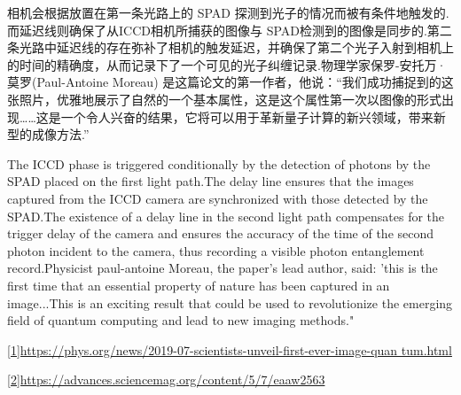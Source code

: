 \begin{multicols}{2}

相机会根据放置在第一条光路上的 SPAD 探测到光子的情况而被有条件地触发的.而延迟线则确保了从ICCD相机所捕获的图像与 SPAD检测到的图像是同步的.第二条光路中延迟线的存在弥补了相机的触发延迟，并确保了第二个光子入射到相机上的时间的精确度，从而记录下了一个可见的光子纠缠记录.物理学家保罗-安托万·莫罗(Paul-Antoine Moreau) 是这篇论文的第一作者，他说：“我们成功捕捉到的这张照片，优雅地展示了自然的一个基本属性，这是这个属性第一次以图像的形式出现……这是一个令人兴奋的结果，它将可以用于革新量子计算的新兴领域，带来新型的成像方法.” 

The ICCD phase is triggered conditionally by the detection of photons by the SPAD placed on the first light path.The delay line ensures that the images captured from the ICCD camera are synchronized with those detected by the SPAD.The existence of a delay line in the second light path compensates for the trigger delay of the camera and ensures the accuracy of the time of the second photon incident to the camera, thus recording a visible photon entanglement record.Physicist paul-antoine Moreau, the paper's lead author, said: 'this is the first time that an essential property of nature has been captured in an image...This is an exciting result that could be used to revolutionize the emerging field of quantum computing and lead to new imaging methods."

\end{multicols}

\noindent {}

\noindent\url{[1]https://phys.org/news/2019-07-scientists-unveil-first-ever-image-quan tum.html }

\noindent\url{[2]https://advances.sciencemag.org/content/5/7/eaaw2563}\vfill

\ADxinhangdao

